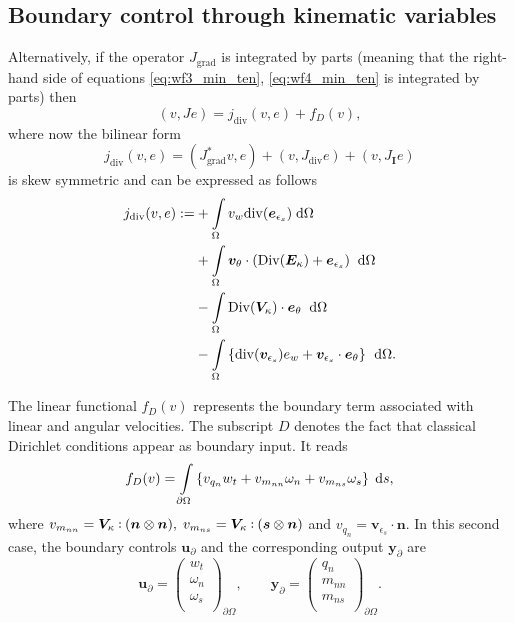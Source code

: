 \documentclass{ifacconf}
\def\onedot{$\mathsurround0pt\ldotp$}
\def\cddot{%
	\mathbin{\vcenter{\baselineskip.67ex
			\hbox{\onedot}\hbox{\onedot}}%
}}
\begin{document}
\subsection{Boundary control through kinematic variables}
\label{subsec:controlDis}
Alternatively, if the operator $J_{\text{grad}}$ is integrated by parts (meaning that 
the right-hand side of equations \eqref{eq:wf3_min_ten}, \eqref{eq:wf4_min_ten} is integrated by parts) then 
\begin{equation}
(v, Je) = j_{\text{div}}(v, e) + f_{D}(v),
\end{equation}
where now the bilinear form 
\[j_{\text{div}}(v, e) = (J_{\text{grad}}^* v, e) + (v, J_{\text{div}}e) + (v, J_{\bm{I}} e)\] 
is skew symmetric and can be expressed as follows
\begin{equation} \label{eq:j_alldiv}
\begin{aligned}
j_{\text{div}}(v, e): =  &+\displaystyle \int_{\Omega} v_w \mathrm{div}(\bm{e}_{\epsilon_s})  \d\Omega \vspace{2mm}\\
&+ \displaystyle \int_{\Omega} \bm{v}_{\theta} \cdot (\mathrm{Div}(\bm{E}_{\kappa}) + \bm{e}_{\epsilon_s}) \;  \d\Omega \vspace{2mm} \\
&- \displaystyle\int_{\Omega} \mathrm{Div}(\bm{V}_{\kappa}) \cdot \bm{e}_\theta \;  \d\Omega  \vspace{2mm} \\
&- \displaystyle\int_{\Omega} \left\{ \mathrm{div}(\bm{v}_{\epsilon_s}) e_w + \bm{v}_{\epsilon_s} \cdot \bm{e}_{\theta} \right\} \, \d\Omega. 
\end{aligned}
\end{equation}

The linear functional $f_{D}(v)$ represents the boundary term associated with linear and angular velocities. The subscript $D$ denotes the fact that classical Dirichlet conditions appear as boundary input. It reads
\begin{equation}
f_{D}(v) =  \displaystyle\int_{\partial \Omega} \left\{ v_{q_{n}} w_t + v_{m_{nn}} \omega_{n} + v_{m_{ns}} \omega_{s}  \right\}  \d{s},
\end{equation}
where $ v_{m_{nn}}=\bm{V}_{\kappa} \cddot (\bm{n}\otimes{\bm{n}}), \;  v_{m_{ns}}=\bm{V}_{\kappa} \cddot (\bm{s} \otimes{\bm{n}})$ and $v_{q_n} = \bm{v}_{\epsilon_s} \cdot \bm{n}$. In this second case,  the boundary controls $\bm{u}_\partial$ and the corresponding output $\bm{y}_\partial$ are 
\[\bm{u}_\partial = 
\begin{pmatrix}
w_t \\
\omega_n \\
\omega_s \\
\end{pmatrix}_{\partial \Omega}, \qquad
\bm{y}_\partial = 
\begin{pmatrix}
{q}_n \\
m_{nn} \\
m_{ns} \\
\end{pmatrix}_{\partial \Omega}.
\]
\end{document}
